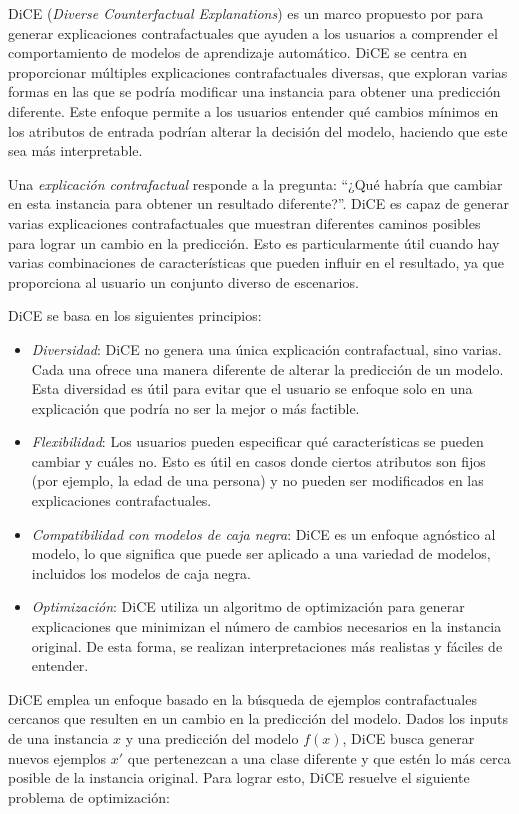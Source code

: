 DiCE (\textit{Diverse Counterfactual Explanations}) es un marco propuesto por \textcite{mothilal2020dice} para generar explicaciones contrafactuales que ayuden a los usuarios a comprender el comportamiento de modelos de aprendizaje automático. DiCE se centra en proporcionar múltiples explicaciones contrafactuales diversas, que exploran varias formas en las que se podría modificar una instancia para obtener una predicción diferente. Este enfoque permite a los usuarios entender qué cambios mínimos en los atributos de entrada podrían alterar la decisión del modelo, haciendo que este sea más interpretable.

Una \textit{explicación contrafactual} responde a la pregunta: “¿Qué habría que cambiar en esta instancia para obtener un resultado diferente?”. DiCE es capaz de generar varias explicaciones contrafactuales que muestran diferentes caminos posibles para lograr un cambio en la predicción. Esto es particularmente útil cuando hay varias combinaciones de características que pueden influir en el resultado, ya que proporciona al usuario un conjunto diverso de escenarios.

DiCE se basa en los siguientes principios:

\begin{itemize}
    \item \textit{Diversidad}: DiCE no genera una única explicación contrafactual, sino varias. Cada una ofrece una manera diferente de alterar la predicción de un modelo. Esta diversidad es útil para evitar que el usuario se enfoque solo en una explicación que podría no ser la mejor o más factible.
    \item \textit{Flexibilidad}: Los usuarios pueden especificar qué características se pueden cambiar y cuáles no. Esto es útil en casos donde ciertos atributos son fijos (por ejemplo, la edad de una persona) y no pueden ser modificados en las explicaciones contrafactuales.
    \item \textit{Compatibilidad con modelos de caja negra}: DiCE es un enfoque agnóstico al modelo, lo que significa que puede ser aplicado a una variedad de modelos, incluidos los modelos de caja negra.
    \item \textit{Optimización}: DiCE utiliza un algoritmo de optimización para generar explicaciones que minimizan el número de cambios necesarios en la instancia original. De esta forma, se realizan interpretaciones más realistas y fáciles de entender.
\end{itemize}

DiCE emplea un enfoque basado en la búsqueda de ejemplos contrafactuales cercanos que resulten en un cambio en la predicción del modelo. Dados los inputs de una instancia $x$ y una predicción del modelo $f(x)$, DiCE busca generar nuevos ejemplos $x'$ que pertenezcan a una clase diferente y que estén lo más cerca posible de la instancia original. Para lograr esto, DiCE resuelve el siguiente problema de optimización:

